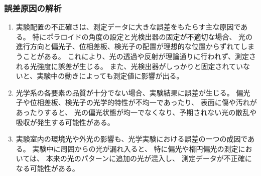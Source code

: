 \documentclass{article}
\begin{document}
\subsubsection{誤差原因の解析}
\begin{enumerate}[label=\alph*), before=\begin{spacing}{1.2}, after=\end{spacing}] %
    \item 実験配置の不正確さは、測定データに大きな誤差をもたらす主な原因である。
    特にポラロイドの角度の設定と光検出器の固定が不適切な場合、
    光の進行方向と偏光子、位相差板、検光子の配置が理想的な位置からずれてしまうことがある。
    これにより、光の透過や反射が理論通りに行われず、測定される光強度に誤差が生じる。
    また、光検出器がしっかりと固定されていないと、実験中の動きによっても測定値に影響が出る。
    \item 光学系の各要素の品質が十分でない場合、実験結果に誤差が生じる。
    偏光子や位相差板、検光子の光学的特性が不均一であったり、
    表面に傷や汚れがあったりすると、
    光の偏光状態が均一でなくなり、予期されない光の散乱や吸収が発生する可能性がある。
    \item 実験室内の環境光や外光の影響も、光学実験における誤差の一つの成因である。
    実験中に周囲からの光が漏れ入ると、
    特に偏光や楕円偏光の測定においては、
    本来の光のパターンに追加の光が混入し、
    測定データが不正確になる可能性がある。
\end{enumerate}
\end{document}
